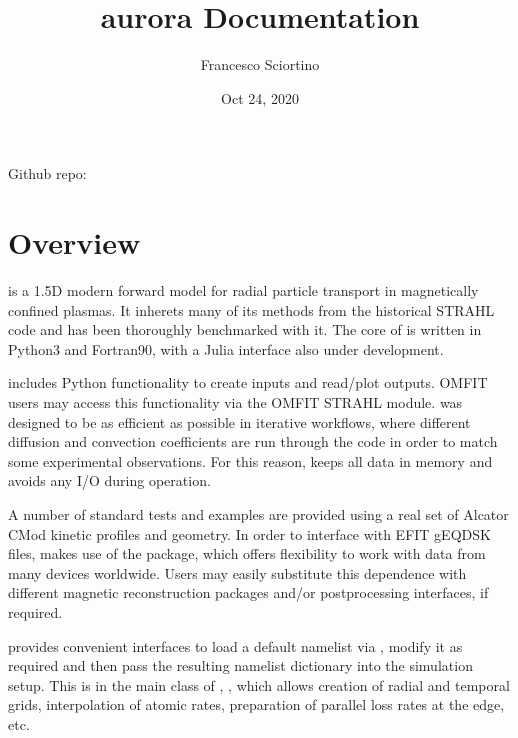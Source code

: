 \documentclass[letterpaper,10pt,english]{sphinxmanual}
\title{aurora Documentation}
\date{Oct 24, 2020}
\author{Francesco Sciortino}
\begin{document}
\pagestyle{empty}
\sphinxmaketitle
\pagestyle{plain}
\sphinxtableofcontents
\pagestyle{normal}
\label{\detokenize{index::doc}}


Github repo: 


\chapter{Overview}
\label{\detokenize{index:overview}}
{\hyperref[\detokenize{aurora:module-aurora}]{}} is a 1.5D modern forward model for radial particle transport in magnetically confined plasmas. It inherets many of its methods from the historical STRAHL code and has been thoroughly benchmarked with it. The core of {\hyperref[\detokenize{aurora:module-aurora}]{}} is written in Python3 and Fortran90, with a Julia interface also under development.

{\hyperref[\detokenize{aurora:module-aurora}]{}} includes Python functionality to create inputs and read/plot outputs. OMFIT users may access this functionality via the OMFIT STRAHL module. {\hyperref[\detokenize{aurora:module-aurora}]{}} was designed to be as efficient as possible in iterative workflows, where different diffusion and convection coefficients are run through the code in order to match some experimental observations. For this reason, {\hyperref[\detokenize{aurora:module-aurora}]{}} keeps all data in memory and avoids any I/O during operation.

A number of standard tests and examples are provided using a real set of Alcator C\sphinxhyphen{}Mod kinetic profiles and geometry. In order to interface with EFIT gEQDSK files, {\hyperref[\detokenize{aurora:module-aurora}]{}} makes use of the  package, which offers flexibility to work with data from many devices worldwide. Users may easily substitute this dependence with different magnetic reconstruction packages and/or postprocessing interfaces, if required.

{\hyperref[\detokenize{aurora:module-aurora}]{}} provides convenient interfaces to load a default namelist via {\hyperref[\detokenize{aurora:module-aurora.default_nml}]{}}, modify it as required and then pass the resulting namelist dictionary into the simulation setup. This is in the main class of {\hyperref[\detokenize{aurora:module-aurora}]{}}, {\hyperref[\detokenize{aurora:aurora.core.aurora_sim}]{}}, which allows creation of radial and temporal grids, interpolation of atomic rates, preparation of parallel loss rates at the edge, etc.
\end{document}
